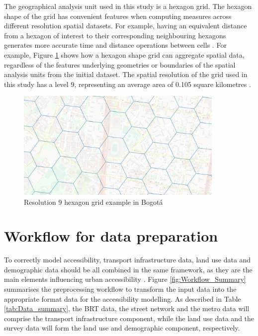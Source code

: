 \documentclass[12pt, a4paper]{report}
\begin{document}
The geographical analysis unit used in this study is a hexagon grid. The hexagon shape of the grid has convenient features when computing measures across different resolution spatial datasets. For example, having an equivalent distance from a hexagon of interest to their corresponding neighbouring hexagons generates more accurate time and distance operations between cells \citep{ubertechnologiesH3HexagonalHierarchical2023}. For example, Figure \ref{fig:Hex_grid_example} shows how a hexagon shape grid can aggregate spatial data, regardless of the features underlying geometries or boundaries of the spatial analysis units from the initial dataset. The spatial resolution of the grid used in this study has a level 9, representing an average area of 0.105 square kilometres \citep{ubertechnologiesH3HexagonalHierarchical2023}.

\begin{figure}[H]
    \centering
    \includegraphics[width=10cm]{Images/Hex_grid.png}
    \caption{Resolution 9 hexagon grid example in Bogotá \citep{openstreetmapcontributorsPlanetDumpRetrieved2023a}}
    \label{fig:Hex_grid_example}
\end{figure}

\section{Workflow for data preparation}

To correctly model accessibility, transport infrastructure data, land use data and demographic data should be all combined in the same framework, as they are the main elements influencing urban accessibility \citep{pereiraIntroductionUrbanAccessibility2023a}. Figure \ref{fig:Workflow_Summary} summarises the preprocessing workflow to transform the input data into the appropriate format data for the accessibility modelling. As described in Table \ref{tab:Data_summary}, the BRT data, the street network and the metro data will comprise the transport infrastructure component, while the land use data and the survey data will form the land use and demographic component, respectively.
\end{document}
